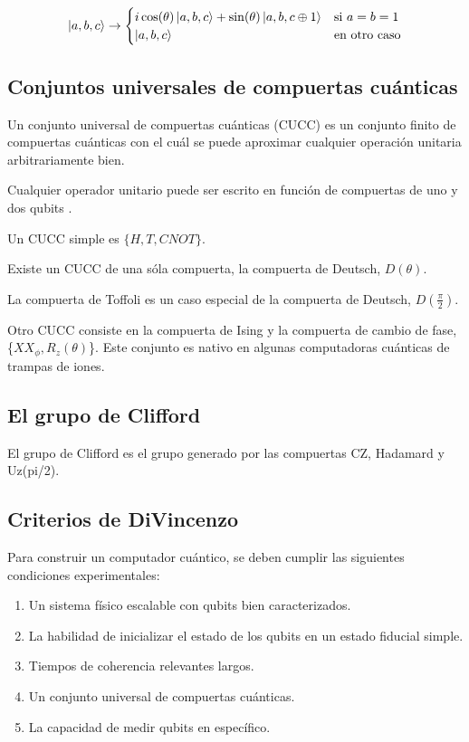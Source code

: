 \begin{enumerate}
\[
    \ket{a,b,c} \rightarrow
    \begin{cases}
        i \cos(\theta) \ket{a,b,c} + \sin(\theta) \ket{a,b,c \oplus 1} & \text{si } a=b=1 \\
        \ket{a,b,c} & \text{en otro caso}
    \end{cases}
\]

\subsection{Conjuntos universales de compuertas cuánticas}
Un conjunto universal de compuertas cuánticas (CUCC) es un conjunto finito de compuertas cuánticas con el cuál se puede aproximar cualquier operación unitaria arbitrariamente bien.
\vspace{0.5cm}

Cualquier operador unitario puede ser escrito en función de compuertas de uno y dos qubits \cite{barenco}.
\vspace{0.5cm}

Un CUCC simple es $\{H,T,\mathit{CNOT}\}$.
\vspace{0.5cm}

Existe un CUCC de una sóla compuerta, la compuerta de Deutsch, $D(\theta)$.
\vspace{0.5cm}

La compuerta de Toffoli es un caso especial de la compuerta de Deutsch, $D(\frac{\pi}{2})$.
\vspace{0.5cm}

Otro CUCC consiste en la compuerta de Ising y la compuerta de cambio de fase, \{$\mathit{XX}_\phi,R_z(\theta)$\}. Este conjunto es nativo en algunas computadoras cuánticas de trampas de iones.

\subsection{El grupo de Clifford}

El grupo de Clifford es el grupo generado por las compuertas CZ, Hadamard y Uz(pi/2).

\subsection{Criterios de DiVincenzo}
Para construir un computador cuántico, se deben cumplir las siguientes condiciones experimentales:

\begin{enumerate}
    \item Un sistema físico escalable con qubits bien caracterizados.
    \item La habilidad de inicializar el estado de los qubits en un estado fiducial simple.
    \item Tiempos de coherencia relevantes largos.
    \item Un conjunto universal de compuertas cuánticas.
    \item La capacidad de medir qubits en específico.
\end{enumerate}


\end{enumerate}
